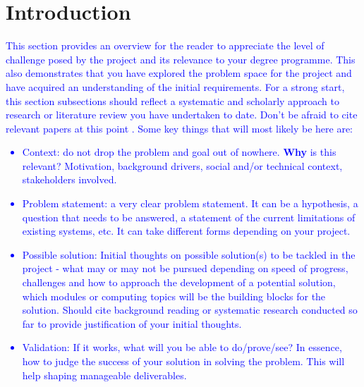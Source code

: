 \documentclass[acmtog, nonacm]{acmart}
\begin{document}



\maketitle

\section{Introduction}
\textcolor{blue}{This section provides an overview for the reader to appreciate the level of challenge posed by the project and its relevance to your degree programme. 
This also demonstrates that you have explored the problem space for the project and have acquired an understanding of the initial requirements.
For a strong start, this section subsections should reflect a systematic and scholarly approach to research or literature review you have undertaken to date.
Don't be afraid to cite relevant papers at this point \cite{graphics}.
Some key things that will most likely be here are:
\begin{itemize}
    \item Context: do not drop the problem and goal out of nowhere. \textbf{Why} is this relevant? Motivation, background drivers, social and/or technical context, stakeholders involved.
    \item Problem statement: a very clear problem statement. It can be a hypothesis, a question that needs to be answered, a statement of the current limitations of existing systems, etc. It can take different forms depending on your project.
    \item Possible solution: Initial thoughts on possible solution(s) to be tackled in the project - what may or may not be pursued depending on speed of progress, challenges and how to approach the development of a potential solution, which modules or computing topics will be the building blocks for the solution.
    Should cite background reading or systematic research conducted so far to provide justification of your initial thoughts.
    \item Validation: If it works, what will you be able to do/prove/see? In essence, how to judge the success of your solution in solving the problem. This will help shaping manageable deliverables. 
\end{itemize}
}
\end{document}
